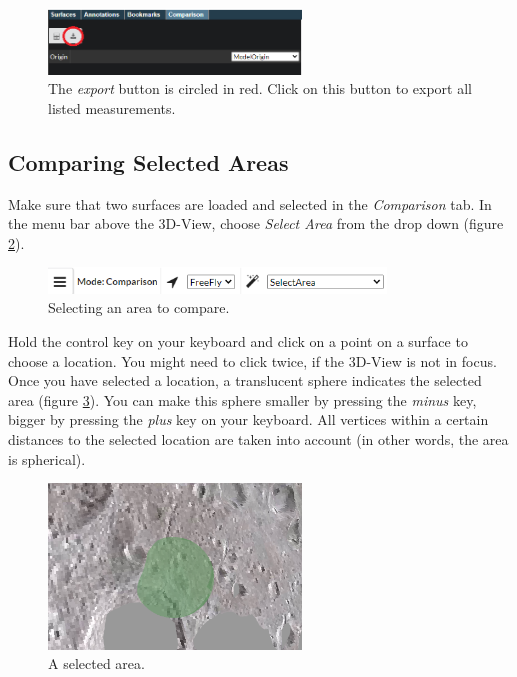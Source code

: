 \begin{figure}[h]
	\centering
	\includegraphics[width=0.6\textwidth]{pics/surfaceComparisonAreaExpButton.PNG}
	\caption[The export button.]{The \emph{export} button is circled in red. Click on this button to export all listed measurements.}
	\label{surfaceComparisonAreaExpButton.PNG}
\end{figure}

\subsection{Comparing Selected Areas}

Make sure that two surfaces are loaded and selected in the \emph{Comparison} tab. In the menu bar above the 3D-View, choose \emph{Select Area} from the drop down (figure \ref{fig:surfaceComparisonAreaSelection}).

\begin{figure}[h]
	\centering
	\includegraphics[width=0.8\textwidth]{pics/surfaceComparisonSelectArea.PNG}
	\caption[Selecting an area to compare.]{Selecting an area to compare.}
	\label{fig:surfaceComparisonAreaSelection}
\end{figure}

Hold the control key on your keyboard and click on a point on a surface to choose a location. You might need to click twice, if the 3D-View is not in focus. Once you have selected a location, a translucent sphere indicates the selected area (figure \ref{fig:surfaceComparisonAreaSphere}). You can make this sphere smaller by pressing the \emph{minus} key, bigger by pressing the \emph{plus} key on your keyboard. All vertices within a certain distances to the selected location are taken into account (in other words, the area is spherical).

\begin{figure}[h]
	\centering
	\includegraphics[width=0.6\textwidth]{pics/surfaceComparisonAreaSphere.PNG}
	\caption[A selected area.]{A selected area.}
	\label{fig:surfaceComparisonAreaSphere}
\end{figure}

